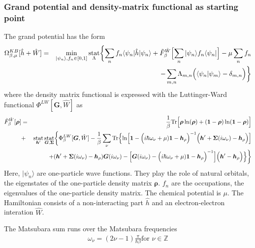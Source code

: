 \documentclass[11pt,a4paper]{report}
\newcommand{\mat}[1]{\bm{#1}}  %
\DeclareMathOperator*{\stat}{stat}
\begin{document}
\subsubsection{Grand potential and density-matrix 
functional as starting point}
The grand potential has the form
\begin{eqnarray}
\Omega^{KB}_{\beta,\mu}[\hat{h}+\hat{W}]
&=&\min_{|\psi_n\rangle,f_n\in[0,1]}\stat_\Lambda
\biggl\lbrace\sum_n f_n\langle\psi_n|\hat{h}|\psi_n\rangle
+\tilde{F}_\beta^{\hat{W}}\Bigl[\sum_n|\psi_n\rangle f_n\langle\psi_n|\Bigr]
-\mu\sum_n f_n\nonumber\\
&&
-\sum_{m,n}\Lambda_{m,n}\Bigl(\langle\psi_n|\psi_m\rangle-\delta_{m,n}\Bigr)
\biggr\rbrace
\label{eq:gcpdm2}
\end{eqnarray}
where the density matrix functional is expressed with the
Luttinger-Ward functional\cite{luttinger60_pr118_1417}
$\Phi^{LW}[\mat{G},\hat{W}]$ as
\begin{eqnarray}
\tilde{F}^{\hat{W}}_\beta[\mat{\rho}]
&=&
\frac{1}{\beta}\Tr\Bigl[
\mat{\rho}\ln(\mat{\rho})+(\mat{1}-\mat{\rho})\ln(\mat{1}-\mat{\rho})\Bigr]
\nonumber\\
&+&
\stat_{\mat{h}'}\stat_{\mat{G},\mat{\Sigma}}
\biggl\lbrace
\Phi^{LW}_\beta[\mat{G},\hat{W}]
-\frac{1}{\beta}\sum_\nu\Tr\Bigl\lbrace
\ln\Bigl[
\mat{1}-
\Bigl(i\hbar\omega_\nu+\mu)\mat{1}-\mat{h}_{\rho}\Bigr)^{-1}
\Bigl(\mat{h}'+\mat{\Sigma}(i\omega_\nu)-\mat{h}_{\rho}\Bigr)
\Bigr]
\nonumber\\&&
+(\mat{h}'+\mat{\Sigma}(i\omega_\nu)-\mat{h}_\rho)\mat{G}(i\omega_\nu)
-
\Bigl[
\mat{G}(i\omega_\nu)
-\Bigl(i\hbar\omega_\nu+\mu)\mat{1}-\mat{h}_{\rho}\Bigr)^{-1}
\Bigr]
\Bigl(\mat{h}'-\mat{h}_\rho\Bigr)\Bigr\rbrace
\biggr\rbrace
\label{eq:dmfgreen}
\end{eqnarray}
Here, $|\psi_n\rangle$ are one-particle wave functions. They play the
role of natural orbitals, the eigenstates of the one-particle density
matrix $\mat{\rho}$. $f_n$ are the occupations, the eigenvalues of the
one-particle density matrix. The chemical potential is $\mu$. The
Hamiltonian consists of a non-interacting part $\hat{h}$ and an
electron-electron interation $\hat{W}$.

The Matsubara sum runs over the Matsubara frequencies 
\begin{eqnarray}
\omega_\nu=(2\nu-1)\frac{\pi}{\hbar\beta}
\text{for $\nu\in\mathbb{Z}$}
\end{eqnarray}
\end{document}

